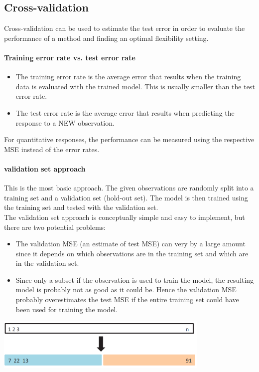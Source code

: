 \documentclass[../document.tex]{subfiles}
\begin{document}
	\subsection{Cross-validation}
	Cross-validation can be used to estimate the test error in order to evaluate the performance of a method and finding an optimal flexibility setting.

	\paragraph{Training error rate vs. test error rate}
	\begin{itemize}
		\item The training error rate is the average error that results when the training data is evaluated with the trained model. This is usually smaller than the test error rate.
		\item The test error rate is the average error that results when predicting the response to a NEW observation.
	\end{itemize}
	For quantitative responses, the performance can be measured using the respective MSE instead of the error rates.

	\paragraph{validation set approach}
	This is the most basic approach. The given observations are randomly split into a training set and a validation set (hold-out set). The model is then trained using the training set and tested with the validation set.\\
	The validation set approach is conceptually simple and easy to implement, but there are two potential problems:
	\begin{itemize}
		\item The validation MSE (an estimate of test MSE) can very by a large amount since it depends on which observations are in the training set and which are in the validation set.
		\item Since only a subset if the observation is used to train the model, the resulting model is probably not as good as it could be. Hence the validation MSE probably overestimates the test MSE if the entire training set could have been used for training the model.
	\end{itemize}
	\begin{center}
		\includegraphics[width=.6\textwidth]{pictures/cross_validation_validation_set.png}
	\end{center}
\end{document}
